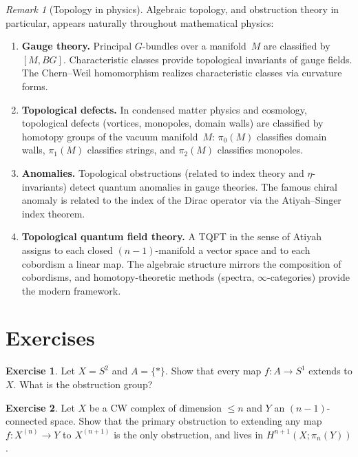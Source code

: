 \documentclass[12pt,a4paper,openany]{book}
\theoremstyle{definition}
\newtheorem{exercise}{Exercise}[chapter]
\theoremstyle{plain}
\theoremstyle{remark}
\newtheorem{remark}[definition]{Remark}
\begin{document}
\begin{remark}[Topology in physics]
Algebraic topology, and obstruction theory in particular, appears
naturally throughout mathematical physics:
\begin{enumerate}[label=(\roman*)]
  \item \textbf{Gauge theory.}  Principal
    $G$-bundles over a manifold~$M$ are classified by $[M,BG]$.
    Characteristic classes provide topological invariants of gauge
    fields.  The Chern--Weil homomorphism realizes characteristic classes via curvature forms.
  \item \textbf{Topological defects.}
    In condensed matter physics and cosmology, topological defects
    (vortices, monopoles, domain walls) are classified by homotopy
    groups of the vacuum manifold~$M$:
    $\pi_0(M)$ classifies domain walls, $\pi_1(M)$ classifies strings,
    and $\pi_2(M)$ classifies monopoles.
  \item \textbf{Anomalies.}  Topological obstructions
    (related to index theory and $\eta$-invariants)
    detect quantum anomalies in gauge theories.  The famous chiral
    anomaly is related to the index of the Dirac
    operator via the Atiyah--Singer index
    theorem.
  \item \textbf{Topological quantum field theory.}
    A TQFT in the sense of Atiyah assigns to each closed
    $(n{-}1)$-manifold a vector space and to each cobordism a linear
    map.  The algebraic structure mirrors the composition of
    cobordisms, and homotopy-theoretic methods (spectra, $\infty$-categories)
    provide the modern framework.
\end{enumerate}
\end{remark}

\section{Exercises}

\begin{exercise}
Let $X=S^2$ and $A=\{*\}$.  Show that every map $f\colon A\to S^1$
extends to $X$.  What is the obstruction group?
\end{exercise}

\begin{exercise}
Let $X$ be a CW complex of dimension $\le n$ and $Y$ an
$(n{-}1)$-connected space.  Show that the primary obstruction to
extending any map $f\colon X^{(n)}\to Y$ to $X^{(n+1)}$ is the only
obstruction, and lives in $H^{n+1}(X;\pi_n(Y))$.
\end{exercise}
\end{document}
